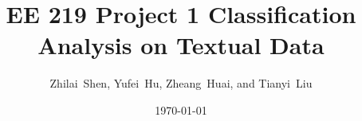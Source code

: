 \documentclass[11pt]{article}
\title{EE 219 Project 1 Classification Analysis on Textual Data}
\author{Zhilai~Shen, Yufei~Hu, Zheang~Huai, and Tianyi~Liu
}
\date{\today}
\newtheorem{theorem}{Theorem}
\begin{document}
\maketitle

\end{document}
